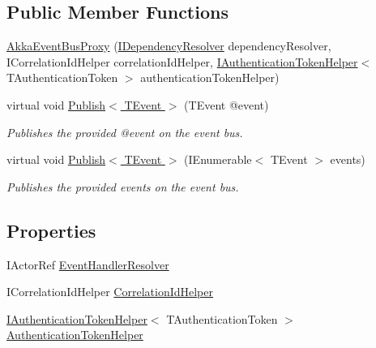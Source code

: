 \subsection*{Public Member Functions}
\begin{DoxyCompactItemize}
\item 
\hyperlink{classCqrs_1_1Akka_1_1Events_1_1AkkaEventBusProxy_a2f886b4e9e64188fe69478c39c96f2b5}{Akka\+Event\+Bus\+Proxy} (\hyperlink{interfaceCqrs_1_1Configuration_1_1IDependencyResolver}{I\+Dependency\+Resolver} dependency\+Resolver, I\+Correlation\+Id\+Helper correlation\+Id\+Helper, \hyperlink{interfaceCqrs_1_1Authentication_1_1IAuthenticationTokenHelper}{I\+Authentication\+Token\+Helper}$<$ T\+Authentication\+Token $>$ authentication\+Token\+Helper)
\item 
virtual void \hyperlink{classCqrs_1_1Akka_1_1Events_1_1AkkaEventBusProxy_a656daead2fe6f30487855dbaea5a3c83}{Publish$<$ T\+Event $>$} (T\+Event @event)
\begin{DoxyCompactList}\small\item\em Publishes the provided {\itshape @event}  on the event bus. \end{DoxyCompactList}\item 
virtual void \hyperlink{classCqrs_1_1Akka_1_1Events_1_1AkkaEventBusProxy_af4c202eaab00ed2fb6160d5b114d935c}{Publish$<$ T\+Event $>$} (I\+Enumerable$<$ T\+Event $>$ events)
\begin{DoxyCompactList}\small\item\em Publishes the provided {\itshape events}  on the event bus. \end{DoxyCompactList}\end{DoxyCompactItemize}
\subsection*{Properties}
\begin{DoxyCompactItemize}
\item 
I\+Actor\+Ref \hyperlink{classCqrs_1_1Akka_1_1Events_1_1AkkaEventBusProxy_abd36f5db7a03a38d573b11c0d6f37117}{Event\+Handler\+Resolver}
\item 
I\+Correlation\+Id\+Helper \hyperlink{classCqrs_1_1Akka_1_1Events_1_1AkkaEventBusProxy_a4cc4ec0ece94393246b0c64f02d55f41}{Correlation\+Id\+Helper}
\item 
\hyperlink{interfaceCqrs_1_1Authentication_1_1IAuthenticationTokenHelper}{I\+Authentication\+Token\+Helper}$<$ T\+Authentication\+Token $>$ \hyperlink{classCqrs_1_1Akka_1_1Events_1_1AkkaEventBusProxy_a54964db320ef21b0564e66e9f258f694}{Authentication\+Token\+Helper}
\end{DoxyCompactItemize}


